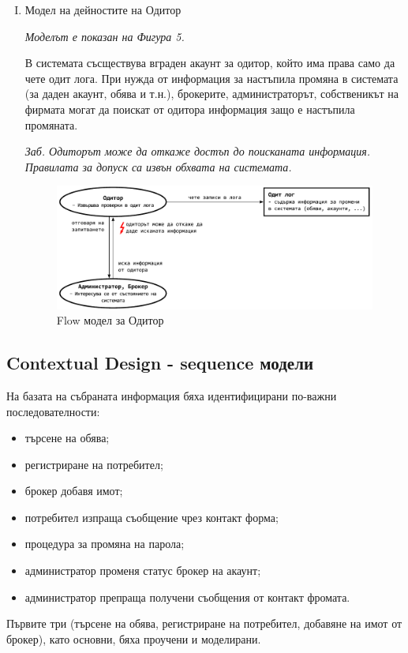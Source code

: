 \documentclass[]{article}
\begin{document}
\begin{enumerate}[I.]
{	} %
	
	\item {Модел на дейностите на Одитор

\emph{Моделът е показан на Фигура 5.} 

В системата съсществува вграден акаунт за одитор, който има права само да чете одит лога. При нужда от информация за настъпила промяна в системата (за даден акаунт, обява и т.н.), брокерите, администраторът, собственикът на фирмата могат да поискат от одитора информация защо е настъпила промяната. 
	
\emph{Заб. Одиторът може да откаже достъп до поисканата информация. Правилата за допуск са извън обхвата на системата.}

	\begin{figure}[h]
	\centering
	\includegraphics[scale=0.85]{flow-auditor-small}
	\caption{Flow модел за Одитор}
	\end{figure}
	
	} %
	
\end{enumerate}

\clearpage

\subsection*{Contextual Design - sequence модели}

На базата на събраната информация бяха идентифицирани по-важни последователности:
\begin{itemize}
	\item търсене на обява;
	\item регистриране на потребител;
	\item брокер добавя имот;
	\item потребител изпраща съобщение чрез контакт форма;
	\item процедура за промяна на парола;
	\item администратор променя статус брокер на акаунт;
	\item администратор препраща получени съобщения от контакт фромата.
\end{itemize}
Първите три (търсене на обява, регистриране на потребител, добавяне на имот от брокер), като основни, бяха проучени и моделирани.
\end{document}
